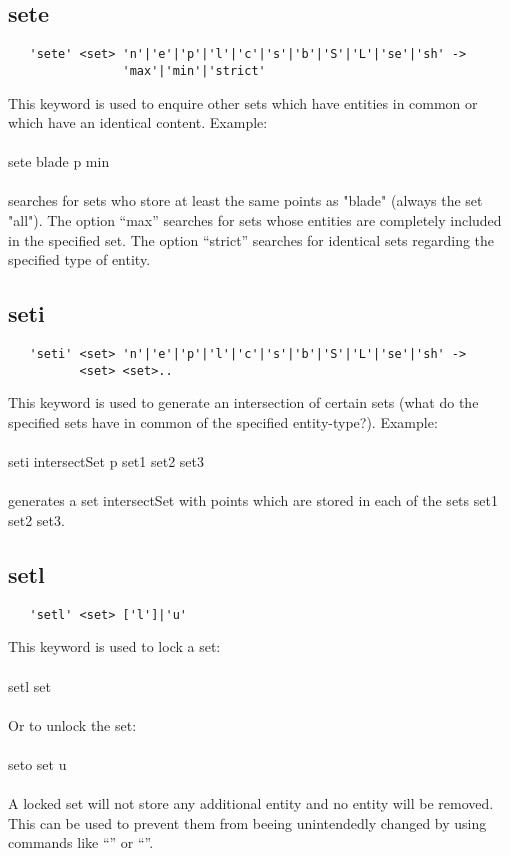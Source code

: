 \documentclass{article}
\begin{document}
\subsection{\label{sete}sete}
\begin{verbatim}
   'sete' <set> 'n'|'e'|'p'|'l'|'c'|'s'|'b'|'S'|'L'|'se'|'sh' ->
                'max'|'min'|'strict'
\end{verbatim}
This keyword is used to enquire other sets which have entities in common or which have an identical content. Example:\\\\sete blade p min\\\\ searches for sets who store at least the same points as "blade" (always the set "all"). The option ``max'' searches for sets whose entities are completely included in the specified set. The option ``strict'' searches for identical sets regarding the specified type of entity.

\subsection{\label{seti}seti}
\begin{verbatim}
   'seti' <set> 'n'|'e'|'p'|'l'|'c'|'s'|'b'|'S'|'L'|'se'|'sh' ->
          <set> <set>.. 
\end{verbatim}
This keyword is used to generate an intersection of certain sets (what do the specified sets have in common of the specified entity-type?). Example:\\\\seti intersectSet p set1 set2 set3\\\\generates a set intersectSet with points which are stored in each of the sets set1 set2 set3.

\subsection{\label{setl}setl}
\begin{verbatim}
   'setl' <set> ['l']|'u' 
\end{verbatim}
This keyword is used to lock a set:\\\\
setl set\\\\
Or to unlock the set:\\\\
seto set u\\\\
A locked set will not store any additional entity and no entity will be removed. This can be used to prevent them from beeing unintendedly changed by using commands like ``'' or ``''.
\end{document}
